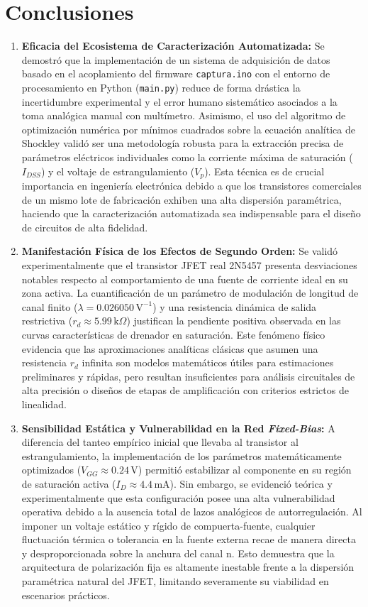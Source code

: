 \documentclass[conference]{IEEEtran}
\begin{document}
\section{Conclusiones}
\begin{enumerate}
    \item \textbf{Eficacia del Ecosistema de Caracterización Automatizada:} Se demostró que la implementación de un sistema de adquisición de datos basado en el acoplamiento del firmware \texttt{captura.ino} con el entorno de procesamiento en Python (\texttt{main.py}) reduce de forma drástica la incertidumbre experimental y el error humano sistemático asociados a la toma analógica manual con multímetro. Asimismo, el uso del algoritmo de optimización numérica por mínimos cuadrados sobre la ecuación analítica de Shockley validó ser una metodología robusta para la extracción precisa de parámetros eléctricos individuales como la corriente máxima de saturación ($I_{DSS}$) y el voltaje de estrangulamiento ($V_p$). Esta técnica es de crucial importancia en ingeniería electrónica debido a que los transistores comerciales de un mismo lote de fabricación exhiben una alta dispersión paramétrica, haciendo que la caracterización automatizada sea indispensable para el diseño de circuitos de alta fidelidad.

    \item \textbf{Manifestación Física de los Efectos de Segundo Orden:} Se validó experimentalmente que el transistor JFET real 2N5457 presenta desviaciones notables respecto al comportamiento de una fuente de corriente ideal en su zona activa. La cuantificación de un parámetro de modulación de longitud de canal finito ($\lambda = 0.026050\,\text{V}^{-1}$) y una resistencia dinámica de salida restrictiva ($r_d \approx 5.99\,\text{k}\Omega$) justifican la pendiente positiva observada en las curvas características de drenador en saturación. Este fenómeno físico evidencia que las aproximaciones analíticas clásicas que asumen una resistencia $r_d$ infinita son modelos matemáticos útiles para estimaciones preliminares y rápidas, pero resultan insuficientes para análisis circuitales de alta precisión o diseños de etapas de amplificación con criterios estrictos de linealidad.

    \item \textbf{Sensibilidad Estática y Vulnerabilidad en la Red \textit{Fixed-Bias}:} A diferencia del tanteo empírico inicial que llevaba al transistor al estrangulamiento, la implementación de los parámetros matemáticamente optimizados ($V_{GG} \approx 0.24\,\text{V}$) permitió estabilizar al componente en su región de saturación activa ($I_D \approx 4.4\,\text{mA}$). Sin embargo, se evidenció teórica y experimentalmente que esta configuración posee una alta vulnerabilidad operativa debido a la ausencia total de lazos analógicos de autorregulación. Al imponer un voltaje estático y rígido de compuerta-fuente, cualquier fluctuación térmica o tolerancia en la fuente externa recae de manera directa y desproporcionada sobre la anchura del canal n. Esto demuestra que la arquitectura de polarización fija es altamente inestable frente a la dispersión paramétrica natural del JFET, limitando severamente su viabilidad en escenarios prácticos.


\end{enumerate}
\end{document}
